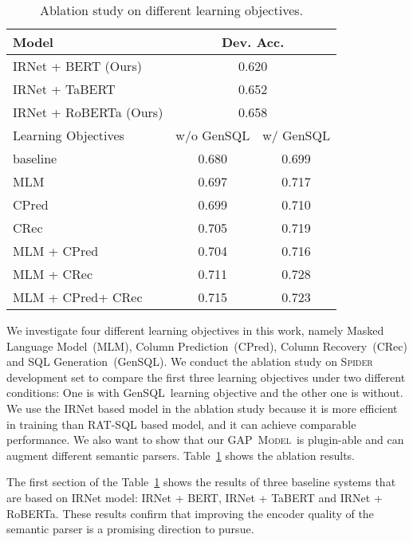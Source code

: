\documentclass[letterpaper]{article} \usepackage{aaai21}  \usepackage{times}  \usepackage{helvet} \usepackage{courier}  \usepackage[hyphens]{url}  \usepackage{graphicx} \usepackage{booktabs}
\newcommand{\modelnamelm}{\textsc{GAP~Model}}
\newcommand{\colpred}{CPred}
\newcommand{\fullcolpred}{Column Prediction~}
\newcommand{\colrec}{CRec}
\newcommand{\fullcolrec}{Column Recovery~}
\newcommand{\gensql}{GenSQL}
\newcommand{\fullgensql}{SQL Generation~}
\begin{document}
\begin{table}[t]
  \centering
  \small

    \begin{tabular}{l|cc}
    \toprule
    \multicolumn{1}{l}{Model} & \multicolumn{2}{c}{Dev. Acc.} \\
    \midrule
    IRNet + BERT (Ours) & \multicolumn{2}{c}{0.620} \\
    IRNet + TaBERT & \multicolumn{2}{c}{0.652} \\
    IRNet + RoBERTa (Ours) & \multicolumn{2}{c}{0.658} \\
    \midrule \midrule
    Learning Objectives & \multicolumn{1}{l}{w/o GenSQL} & \multicolumn{1}{l}{w/ GenSQL} \\
    \midrule
    baseline & 0.680 & 0.699 \\
    \midrule
    MLM   & 0.697 & 0.717 \\
    \colpred & 0.699 & 0.710 \\
    \colrec &  0.705 & 0.719 \\
    MLM + \colpred & 0.704 & 0.716 \\
    MLM + \colrec & 0.711 &  0.728\\
    MLM + \colpred + \colrec & 0.715 & 0.723 \\
    \bottomrule
    \end{tabular}\caption{Ablation study on different learning objectives.}
  \label{tab:ablation:objectives}\vspace{-0.3cm}
\end{table}

We investigate four different learning objectives in this work, namely Masked Language Model~(MLM), \fullcolpred(\colpred), \fullcolrec(\colrec) and \fullgensql(\gensql).
We conduct the ablation study on \textsc{Spider} development set to compare the first three learning objectives under two different conditions: One is with \gensql~learning objective and the other one is without. 
We use the IRNet based model in the ablation study because it is more efficient in training than RAT-SQL based model, and it can achieve comparable performance.
We also want to show that our \modelnamelm~is plugin-able and can augment different semantic parsers.
Table~\ref{tab:ablation:objectives} shows the ablation results.

The first section of the Table~\ref{tab:ablation:objectives} shows the results of three baseline systems that are based on IRNet model: IRNet + BERT, IRNet + TaBERT and IRNet + RoBERTa.
These results confirm that improving the encoder quality of the semantic parser is a promising direction to pursue.
\end{document}
